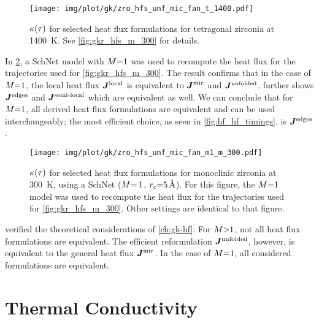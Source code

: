 \begin{figure}
  \texttt{[image: img/plot/gk/zro\_hfs\_unf\_mic\_fan\_t\_1400.pdf]}
  \caption{
  $\kappa(\tau)$ for selected heat flux formulations for tetragonal zirconia at \qty{1400}{K}.
  See \cref{fig:gkr_hfs_m_300} for details.
  }
  \label{fig:gkr_hfs_t_1400}
\end{figure}

In \cref{fig:gkr_hfs_m1_m_300}, a SchNet model with $M{=}1$ was used to recompute the heat flux for the trajectories used for \cref{fig:gkr_hfs_m_300}. The result confirms that in the case of $M{=}1$, the local heat flux $\boldsymbol{J}^{\text{local}}$ is equivalent to $\boldsymbol{J}^{\text{mic}}$ and $\boldsymbol{J}^{\text{unfolded}}$. 
 further shows $\boldsymbol{J}^{\text{edges}}$ and $\boldsymbol{J}^{\text{semi-local}}$ which are equivalent as well.
We can conclude that for $M{=}1$, all derived heat flux formulations are equivalent and can be used interchangeably; the most efficient choice, as seen in \cref{fig:hf_hf_timings}, is $\boldsymbol{J}^{\text{edges}}$.

\begin{figure}
  \texttt{[image: img/plot/gk/zro\_hfs\_unf\_mic\_fan\_m1\_m\_300.pdf]}
  \caption{
  $\kappa(\tau)$ for selected heat flux formulations for monoclinic zirconia at \qty{300}{K},
  using a SchNet \glp ($M{=\,}1$, $r_{\text{c}}{=}\qty{5}{\angstrom}$).
  For this figure, the $M{=}1$ model was used to recompute the heat flux for the trajectories used for \cref{fig:gkr_hfs_m_300}.
  Other settings are identical to that figure.
  }
  \label{fig:gkr_hfs_m1_m_300}
\end{figure}

 verified the theoretical considerations of \cref{ch:gk-hf}: For $M{>}1$, not all heat flux formulations are equivalent.
The efficient reformulation $\boldsymbol{J}^{\text{unfolded}}$, however, is equivalent to the general heat flux $\boldsymbol{J}^{\text{mic}}$.
In the case of $M{=}1$, all considered formulations are equivalent.

\section{Thermal Conductivity}



